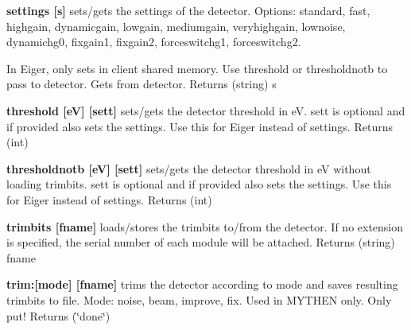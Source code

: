 \begin{DoxyItemize}
\item {\bfseries settings \mbox{[}s\mbox{]}} sets/gets the settings of the detector. Options: {\ttfamily standard}, {\ttfamily fast}, {\ttfamily highgain}, {\ttfamily dynamicgain}, {\ttfamily lowgain}, {\ttfamily mediumgain}, {\ttfamily veryhighgain}, {\ttfamily lownoise}, {\ttfamily dynamichg0}, {\ttfamily fixgain1}, {\ttfamily fixgain2}, {\ttfamily forceswitchg1}, {\ttfamily forceswitchg2}. \par
 In Eiger, only sets in client shared memory. Use {\ttfamily threshold} or {\ttfamily thresholdnotb} to pass to detector. Gets from detector. {\ttfamily Returns} {\ttfamily }(string) s
\end{DoxyItemize}


\begin{DoxyItemize}
\item {\bfseries threshold \mbox{[}eV\mbox{]} \mbox{[}sett\mbox{]} } sets/gets the detector threshold in eV. sett is optional and if provided also sets the settings. Use this for Eiger instead of {\ttfamily settings}. {\ttfamily Returns} {\ttfamily }(int)
\end{DoxyItemize}


\begin{DoxyItemize}
\item {\bfseries thresholdnotb \mbox{[}eV\mbox{]} \mbox{[}sett\mbox{]} } sets/gets the detector threshold in eV without loading trimbits. sett is optional and if provided also sets the settings. Use this for Eiger instead of {\ttfamily settings}. {\ttfamily Returns} {\ttfamily }(int)
\end{DoxyItemize}


\begin{DoxyItemize}
\item {\bfseries trimbits \mbox{[}fname\mbox{]} } loads/stores the trimbits to/from the detector. If no extension is specified, the serial number of each module will be attached. {\ttfamily Returns} {\ttfamily }(string) fname
\end{DoxyItemize}


\begin{DoxyItemize}
\item {\bfseries trim:\mbox{[}mode\mbox{]} \mbox{[}fname\mbox{]}} trims the detector according to mode and saves resulting trimbits to file. Mode: noise, beam, improve, fix. Used in MYTHEN only. Only put! {\ttfamily Returns} {\ttfamily }(\char`\"{}done\char`\"{})
\end{DoxyItemize}


